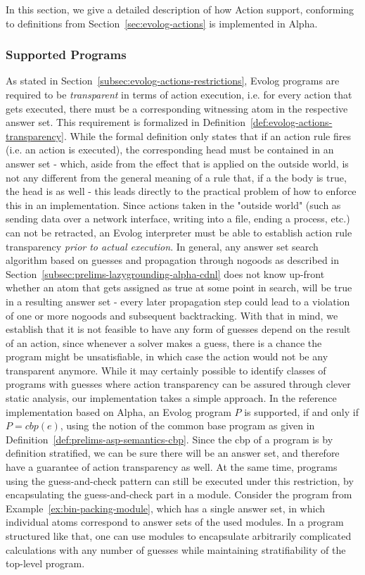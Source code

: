 In this section, we give a detailed description of how Action support, conforming to definitions from Section~\ref{sec:evolog-actions} is implemented in Alpha.

\subsubsection{Supported Programs}
\label{subsubsec:implementation-actions-support}
As stated in Section~\ref{subsec:evolog-actions-restrictions}, Evolog programs are required to be \emph{transparent} in terms of action execution, i.e. for every action that gets executed, there must be a corresponding witnessing atom in the respective answer set. This requirement is formalized in Definition~\ref{def:evolog-actions-transparency}. While the formal definition only states that if an action rule fires (i.e. an action is executed), the corresponding head must be contained in an answer set - which, aside from the effect that is applied on the outside world, is not any different from the general meaning of a rule that, if a the body is true, the head is as well - this leads directly to the practical problem of how to enforce this in an implementation. Since actions taken in the "outside world" (such as sending data over a network interface, writing into a file, ending a process, etc.) can not be retracted, an Evolog interpreter must be able to establish action rule transparency \emph{prior to actual execution}. In general, any answer set search algorithm based on guesses and propagation through nogoods as described in Section~\ref{subsec:prelims-lazygrounding-alpha-cdnl} does not know up-front whether an atom that gets assigned as true at some point in search, will be true in a resulting answer set - every later propagation step could lead to a violation of one or more nogoods and subsequent backtracking. With that in mind, we establish that it is not feasible to have any form of guesses depend on the result of an action, since whenever a solver makes a guess, there is a chance the program might be unsatisfiable, in which case the action would not be any transparent anymore. While it may certainly possible to identify classes of programs with guesses where action transparency can be assured through clever static analysis, our implementation takes a simple approach. In the reference implementation based on Alpha, an Evolog program $P$ is supported, if and only if $P = cbp(e)$, using the notion of the common base program as given in Definition~\ref{def:prelims-asp-semantics-cbp}. Since the \gls{cbp} of a program is by definition stratified, we can be sure there will be an answer set, and therefore have a guarantee of action transparency as well. At the same time, programs using the guess-and-check pattern can still be executed under this restriction, by encapsulating the guess-and-check part in a module. Consider the program from Example~\ref{ex:bin-packing-module}, which has a single answer set, in which individual atoms correspond to answer sets of the used modules. In a program structured like that, one can use modules to encapsulate arbitrarily complicated calculations with any number of guesses while maintaining stratifiability of the top-level program.
